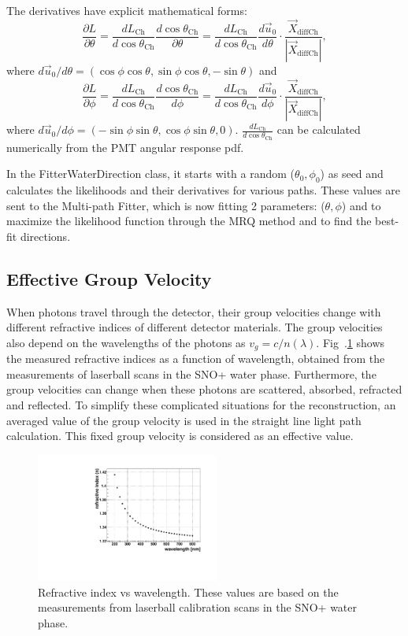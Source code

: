 The derivatives have explicit mathematical forms:
\[
\frac{\partial L}{\partial\theta}=\frac{dL_{\mathrm{Ch}}}{d\cos\theta_{\mathrm{Ch}}}\frac{d\cos\theta_{\mathrm{Ch}}}{\partial\theta}
=\frac{dL_{\mathrm{Ch}}}{d\cos\theta_{\mathrm{Ch}}}\frac{d\vec{u}_0}{d\theta}\cdot\frac{\vec{X}_{{\mathrm{diffCh}}}}{|\vec{X}_{{\mathrm{diffCh}}}|},
\]
where $d\vec{u}_0/d\theta=(\cos\phi\cos\theta, \sin\phi\cos\theta, -\sin\theta)$ and 
\[
\frac{\partial　L}{\partial\phi}=\frac{dL_{\mathrm{Ch}}}{d\cos\theta_{\mathrm{Ch}}}\frac{d\cos\theta_{\mathrm{Ch}}}{d\phi}
=\frac{dL_{\mathrm{Ch}}}{d\cos\theta_{\mathrm{Ch}}}\frac{d\vec{u}_0}{d\phi}\cdot\frac{\vec{X}_{{\mathrm{diffCh}}}}{|\vec{X}_{{\mathrm{diffCh}}}|},
\] where $d\vec{u}_0/d\phi=(-\sin\phi\sin\theta, \cos\phi\sin\theta, 0)$. $\frac{dL_{\mathrm{Ch}}}{d\cos\theta_{\mathrm{Ch}}}$ can be calculated numerically from the PMT angular response pdf.

In the FitterWaterDirection class, it starts with a random ($\theta_0,\phi_0$) as seed and calculates the likelihoods and their derivatives for various paths. These values are sent to the Multi-path Fitter, which is now fitting 2 parameters: ($\theta,\phi$) and to maximize the likelihood function through the MRQ method and to find the best-fit directions.

\subsection{Effective Group Velocity}\label{tuneGroupVelocity}
When photons travel through the detector, their group velocities change with different refractive indices of different detector materials. The group velocities also depend on the wavelengths of the photons as $v_g=c/n(\lambda)$. Fig~.\ref{nVsWavelength} shows the measured refractive indices as a function of wavelength, obtained from the measurements of laserball scans in the SNO+ water phase\cite{laserball_groupVelocity}. Furthermore, the group velocities can change when these photons are scattered, absorbed, refracted and reflected. To simplify these complicated situations for the reconstruction, an averaged value of the group velocity is used in the straight line light path calculation. This fixed group velocity is considered as an effective value.

\begin{figure}[!htb]
	\centering
	\includegraphics[width=6cm]{refractiveIndexVsWavelength.pdf}
	\caption{Refractive index vs wavelength. These values are based on the measurements from laserball calibration scans in the SNO+ water phase\cite{laserball_groupVelocity}.}
	\label{nVsWavelength}
\end{figure}

